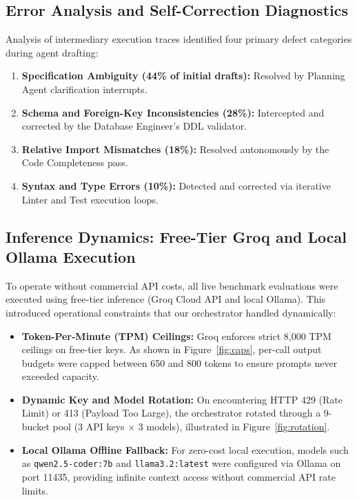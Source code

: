 \documentclass[10pt,journal,compsoc]{IEEEtran}
\begin{document}
\subsection{Error Analysis and Self-Correction Diagnostics}
Analysis of intermediary execution traces identified four primary defect categories during agent drafting:
\begin{enumerate}
    \item \textbf{Specification Ambiguity (44\% of initial drafts):} Resolved by Planning Agent clarification interrupts.
    \item \textbf{Schema and Foreign-Key Inconsistencies (28\%):} Intercepted and corrected by the Database Engineer's DDL validator.
    \item \textbf{Relative Import Mismatches (18\%):} Resolved autonomously by the Code Completeness pass.
    \item \textbf{Syntax and Type Errors (10\%):} Detected and corrected via iterative Linter and Test execution loops.
\end{enumerate}

\subsection{Inference Dynamics: Free-Tier Groq and Local Ollama Execution}
To operate without commercial API costs, all live benchmark evaluations were executed using free-tier inference (Groq Cloud API and local Ollama). This introduced operational constraints that our orchestrator handled dynamically:
\begin{itemize}
    \item \textbf{Token-Per-Minute (TPM) Ceilings:} Groq enforces strict 8,000 TPM ceilings on free-tier keys. As shown in Figure~\ref{fig:caps}, per-call output budgets were capped between 650 and 800 tokens to ensure prompts never exceeded capacity.
    \item \textbf{Dynamic Key and Model Rotation:} On encountering HTTP 429 (Rate Limit) or 413 (Payload Too Large), the orchestrator rotated through a 9-bucket pool (3 API keys $\times$ 3 models), illustrated in Figure~\ref{fig:rotation}.
    \item \textbf{Local Ollama Offline Fallback:} For zero-cost local execution, models such as \texttt{qwen2.5-coder:7b} and \texttt{llama3.2:latest} were configured via Ollama on port 11435, providing infinite context access without commercial API rate limits.
\end{itemize}
\end{document}
